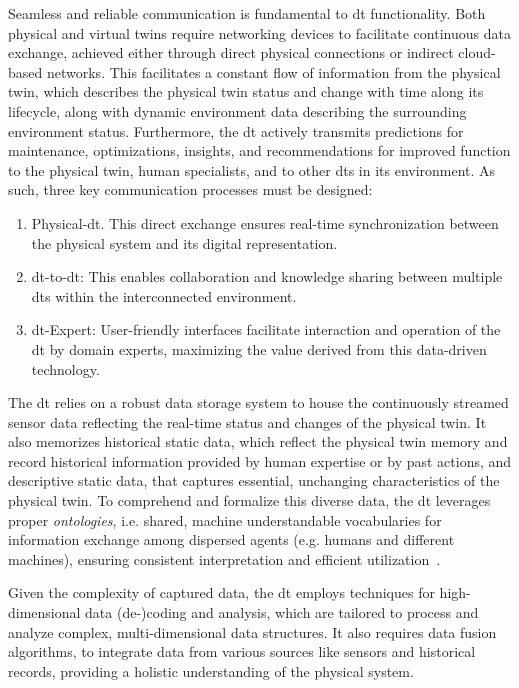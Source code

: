     Seamless and reliable communication is fundamental to \acrshort{dt} functionality. Both physical and virtual twins require networking devices to facilitate continuous data exchange, achieved either through direct physical connections or indirect cloud-based networks. This facilitates a constant flow of information from the physical twin, which describes the physical twin status and change with time along its lifecycle, along with dynamic environment data describing the surrounding environment status. Furthermore, the \acrshort{dt} actively transmits predictions for maintenance, optimizations, insights, and recommendations for improved function to the physical twin, human specialists, and to other \acrshort{dt}s in its environment. As such, three key communication processes must be designed:

    \begin{enumerate}
        \item Physical-\acrshort{dt}. This direct exchange ensures real-time synchronization between the physical system and its digital representation.
        \item \acrshort{dt}-to-\acrshort{dt}: This enables collaboration and knowledge sharing between multiple \acrshort{dt}s within the interconnected environment.
        \item \acrshort{dt}-Expert: User-friendly interfaces facilitate interaction and operation of the \acrshort{dt} by domain experts, maximizing the value derived from this data-driven technology.
    \end{enumerate}

    The \acrshort{dt} relies on a robust data storage system to house the continuously streamed sensor data reflecting the real-time status and changes of the physical twin.
    It also memorizes historical static data, which reflect the physical twin memory and record historical information provided by human expertise or by past actions, and descriptive static data, that captures essential, unchanging characteristics of the physical twin. To comprehend and formalize this diverse data, the \acrshort{dt} leverages proper \textit{ontologies}, i.e. shared, machine understandable vocabularies for information exchange among dispersed agents (e.g. humans and different machines), ensuring consistent interpretation and efficient utilization~\parencite{negriReviewRolesDigital2017}.

    Given the complexity of captured data, the \acrshort{dt} employs techniques for high-dimensional data (de-)coding and analysis, which are tailored to process and analyze complex, multi-dimensional data structures. It also requires data fusion algorithms, to integrate data from various sources like sensors and historical records, providing a holistic understanding of the physical system.

